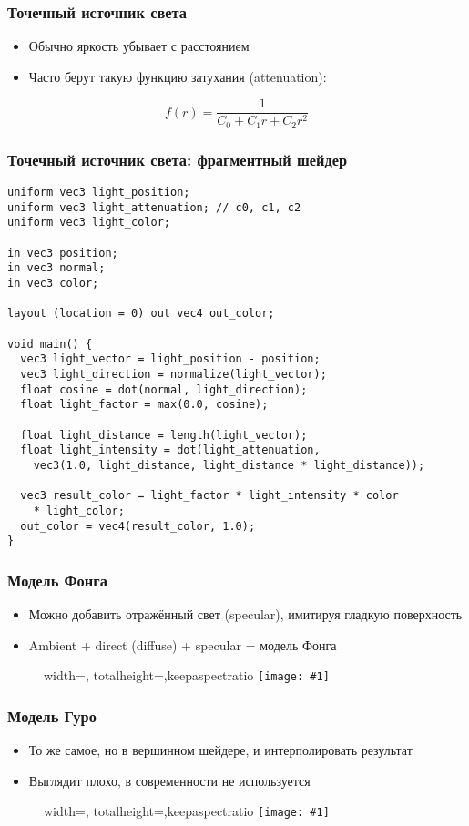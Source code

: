 \documentclass{beamer}
\newcommand{\slideimage}[1]{
  \begin{figure}
    \begin{adjustbox}{width=\textwidth, totalheight=\textheight-2\baselineskip-2\baselineskip,keepaspectratio}
      \texttt{[image: \#1]}
    \end{adjustbox}
  \end{figure}
}
\begin{document}
\begin{frame}[fragile]
\frametitle{Точечный источник света}
\begin{itemize}
\item Обычно яркость убывает с расстоянием
\pause
\item Часто берут такую функцию затухания (attenuation):
\end{itemize}
\begin{equation}
f(r) = \frac{1}{C_0 + C_1 r + C_2 r^2}
\end{equation}
\end{frame}

\begin{frame}[fragile]
\frametitle{Точечный источник света: фрагментный шейдер}
\fontsize{10pt}{10pt}
\begin{verbatim}
uniform vec3 light_position;
uniform vec3 light_attenuation; // c0, c1, c2
uniform vec3 light_color;

in vec3 position;
in vec3 normal;
in vec3 color;

layout (location = 0) out vec4 out_color;

void main() {
  vec3 light_vector = light_position - position;
  vec3 light_direction = normalize(light_vector);
  float cosine = dot(normal, light_direction);
  float light_factor = max(0.0, cosine);

  float light_distance = length(light_vector);
  float light_intensity = dot(light_attenuation, 
    vec3(1.0, light_distance, light_distance * light_distance));

  vec3 result_color = light_factor * light_intensity * color
    * light_color;
  out_color = vec4(result_color, 1.0);
}
\end{verbatim}
\end{frame}

\begin{frame}[fragile]
\frametitle{Модель Фонга}
\begin{itemize}
\item Можно добавить отражённый свет (specular), имитируя гладкую поверхность
\pause
\item Ambient + direct (diffuse) + specular = модель Фонга
\end{itemize}
\slideimage{phong.png}
\end{frame}

\begin{frame}[fragile]
\frametitle{Модель Гуро}
\begin{itemize}
\item То же самое, но в вершинном шейдере, и интерполировать результат
\item Выглядит плохо, в современности не используется
\end{itemize}
\slideimage{gourand.png}
\end{frame}
\end{document}
